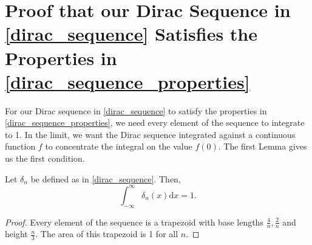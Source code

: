 \documentclass{siamart1116}
\begin{document}
\section{Proof that our Dirac Sequence in \eqref{dirac_sequence} Satisfies the Properties in \eqref{dirac_sequence_properties}}\label{s:dirac_sequence_proof}
For our Dirac sequence in \eqref{dirac_sequence} to satisfy the properties in \eqref{dirac_sequence_properties}, we need every element of the sequence to integrate to 1. In the limit, we want the Dirac sequence integrated against a continuous function $f$ to concentrate the integral on the value $f(0)$. The first Lemma gives us the first condition.
\begin{lemma} \label{integral_lemma}
Let $\delta_n$ be defined as in \eqref{dirac_sequence}. Then,
$$\int_{-\infty}^{\infty}\delta_n(x)\mathrm{d}x=1.$$
\end{lemma}
\begin{proof}
Every element of the sequence is a trapezoid with base lengths $\frac{4}{n},\frac{2}{n}$ and height $\frac{n}{3}$. The area of this trapezoid is 1 for all $n$. 
\end{proof}
\end{document}
